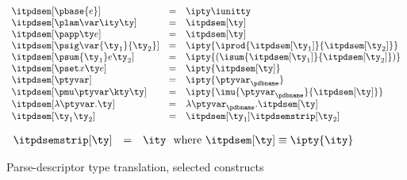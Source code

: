 \begin{figure}
\fbox{$\itpdsem[\ty] = \ity$}
\[ 
\begin{array}{lcl} 
\itpdsem[\pbase{e}] & = & \ipty \iunitty\\
\itpdsem[\plam \var \ity \ty] & = & \itpdsem[\ty] \\
\itpdsem[\papp \ty e] & = & \itpdsem[\ty] \\
\itpdsem[\psig \var {\ty_1} {\ty_2}] & = & 
               \ipty {\iprod {\itpdsem[\ty_1]} {\itpdsem[\ty_2]}} \\
\itpdsem[\psum {\ty_1} e {\ty_2}] & = & 
               \ipty {(\isum {\itpdsem[\ty_1]} {\itpdsem[\ty_2]})} \\
\itpdsem[\pset x \ty e] & = & \ipty {\itpdsem[\ty]} \\
\itpdsem[\ptyvar] & = & \ipty{\ptyvar_\pdbname} \\
\itpdsem[\pmu \ptyvar \kty \ty] & = & 
  \ipty{\imu{\ptyvar_\pdbname}{\itpdsem[\ty]}} \\
\itpdsem[\lambda \ptyvar.\ty]      
     & = & \lambda \ptyvar_\pdbname.\itpdsem[\ty] \\
\itpdsem[\ty_1 \ty_2]            & = & \itpdsem[\ty_1] \itpdsemstrip[\ty_2] \\
\end{array}
\]

\fbox{$\itpdsemstrip[\ty] = \ity$}

\[
\begin{array}{lcl} 
\itpdsemstrip[\ty] & = & \ity \ \ \mbox{where}\ \itpdsem[\ty] \equiv \ipty{\ity}
\end{array}
\]
\caption{Parse-descriptor type translation, selected constructs}
\label{fig:pd-tys}
\end{figure}

